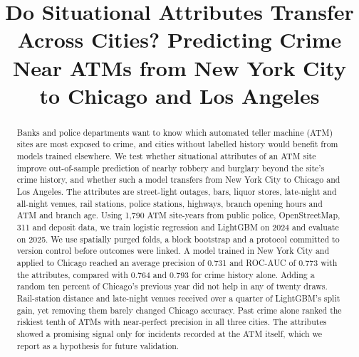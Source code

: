 \documentclass[conference]{IEEEtran}
\begin{document}
\title{Do Situational Attributes Transfer Across Cities? Predicting Crime Near ATMs from New York City to Chicago and Los Angeles}

\author{
\and
{}
\and
{}
}

\maketitle

\begin{abstract}
Banks and police departments want to know which automated teller machine (ATM) sites are most exposed to crime, and
cities without labelled history would benefit from models trained elsewhere. We test whether situational attributes
of an ATM site improve out-of-sample prediction of nearby robbery and burglary beyond the site's crime history, and
whether such a model transfers from New York City to Chicago and Los Angeles. The attributes are street-light
outages, bars, liquor stores, late-night and all-night venues, rail stations, police stations, highways, branch
opening hours and ATM and branch age. Using 1,790 ATM site-years from public police, OpenStreetMap, 311 and
deposit data, we train logistic regression and LightGBM on 2024 and evaluate on 2025. We use spatially purged folds,
a block bootstrap and a protocol committed to version control before outcomes were linked. A model trained in New
York City and applied to Chicago reached an average precision of 0.731 and ROC-AUC of 0.773 with the attributes,
compared with 0.764 and 0.793 for crime history alone. Adding a random ten percent of Chicago's previous year did not
help in any of twenty draws. Rail-station distance and late-night venues received over a quarter of LightGBM's split
gain, yet removing them barely changed Chicago accuracy. Past crime alone ranked the riskiest tenth of ATMs with
near-perfect precision in all three cities. The attributes showed a promising signal only for incidents recorded at
the ATM itself, which we report as a hypothesis for future validation.
\end{abstract}
\end{document}
